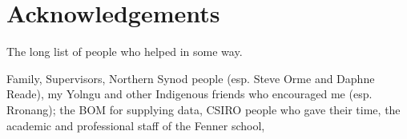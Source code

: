 \chapter{Acknowledgements}




\vspace{3in}


The long list of people who helped in some way.

Family, Supervisors, Northern Synod people (esp. Steve Orme and Daphne Reade),
my Yolngu and other Indigenous friends who encouraged me (esp. Rronang);
the BOM for supplying data, CSIRO people who gave their time,
the academic and professional staff of the Fenner school,


